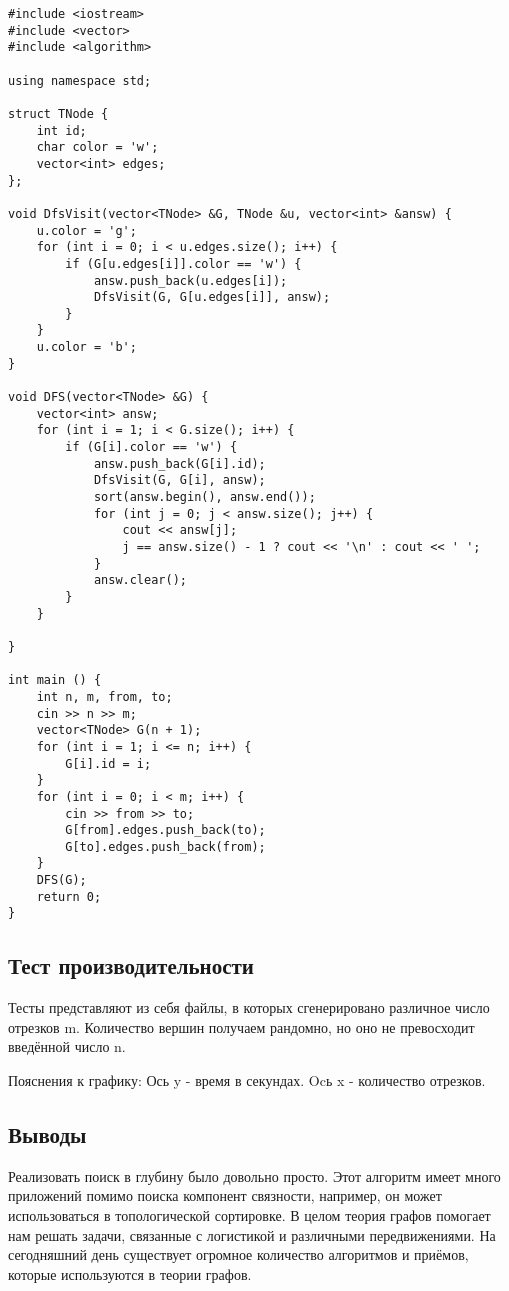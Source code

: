 \documentclass[12pt]{article}
\begin{document}
\begin{verbatim}
#include <iostream>
#include <vector>
#include <algorithm>

using namespace std;

struct TNode {
	int id;
	char color = 'w';
	vector<int> edges;
};

void DfsVisit(vector<TNode> &G, TNode &u, vector<int> &answ) {
	u.color = 'g';
	for (int i = 0; i < u.edges.size(); i++) {
		if (G[u.edges[i]].color == 'w') {
			answ.push_back(u.edges[i]);
			DfsVisit(G, G[u.edges[i]], answ);
		}
	}
	u.color = 'b';
}

void DFS(vector<TNode> &G) {
	vector<int> answ;
	for (int i = 1; i < G.size(); i++) {
		if (G[i].color == 'w') {
			answ.push_back(G[i].id);
			DfsVisit(G, G[i], answ);
			sort(answ.begin(), answ.end());
			for (int j = 0; j < answ.size(); j++) {
				cout << answ[j];
				j == answ.size() - 1 ? cout << '\n' : cout << ' ';
			}
			answ.clear();
		}
	}
	
}

int main () {
	int n, m, from, to;
	cin >> n >> m;
	vector<TNode> G(n + 1);
	for (int i = 1; i <= n; i++) {
		G[i].id = i;
	}
	for (int i = 0; i < m; i++) {
		cin >> from >> to;	
		G[from].edges.push_back(to);
		G[to].edges.push_back(from);
	}
	DFS(G);
	return 0;
}
\end{verbatim}

\subsection*{Тест производительности}

Тесты представляют из себя файлы, в которых сгенерировано различное число отрезков m. Количество вершин получаем рандомно, но оно не превосходит введённой число n.

\newline
Пояснения к графику:
Ось y - время в секундах. Ocь x - количество отрезков.

\subsection*{Выводы}

Реализовать поиск в глубину было довольно просто. Этот алгоритм имеет много приложений помимо поиска компонент связности, например, он может использоваться в топологической сортировке. В целом теория графов помогает нам решать задачи, связанные с логистикой и различными передвижениями. На сегодняшний день существует огромное количество алгоритмов и приёмов, которые используются в теории графов.
\end{document}
